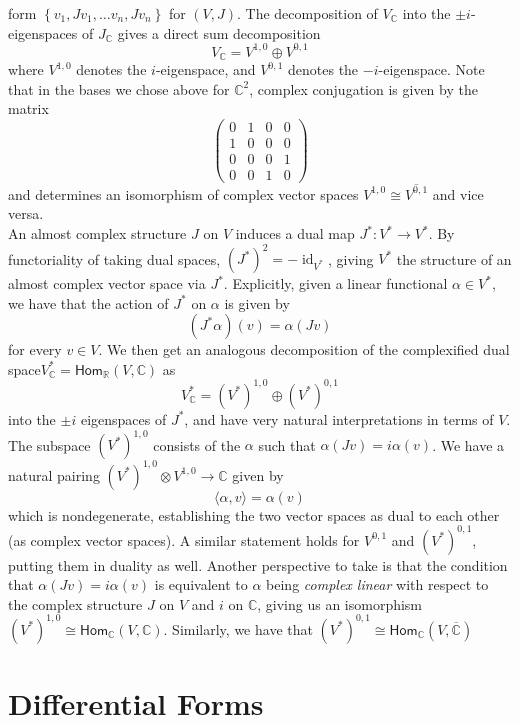 \documentclass[psamsfonts, 12pt]{amsart}
\theoremstyle{definition}
\theoremstyle{remark}
\renewcommand{\hom}{\mathsf{Hom}}
\newcommand{\R}{\mathbb{R}}
\newcommand{\C}{\mathbb{C}}
\newcommand{\set}[1]{\left\lbrace #1 \right\rbrace}
\DeclareMathOperator{\id}{id}
\begin{document}
form $\set{v_1, Jv_1, \ldots v_n, Jv_n}$ for $(V,J)$. The decomposition of $V_\C$ into
the $\pm i$-eigenspaces of $J_\C$ gives a direct sum decomposition
\[
V_\C = V^{1,0} \oplus V^{0,1}
\]
where $V^{1,0}$ denotes the $i$-eigenspace, and $V^{0,1}$ denotes the $-i$-eigenspace.
Note that in the bases we chose above for $\C^2$, complex conjugation is given by the
matrix
\[
\begin{pmatrix}
0 & 1 & 0 & 0\\
1 & 0 & 0 & 0 \\
0 & 0 & 0 & 1 \\
0 & 0 & 1 & 0
\end{pmatrix}
\]
and determines an isomorphism of complex vector spaces
$V^{1,0} \cong \overline{V^{0,1}}$ and vice versa. \\

An almost complex structure $J$ on $V$ induces a dual map $J^* : V^* \to V^*$. By
functoriality of taking dual spaces, $(J^*) ^2 = -\id_{V^*}$, giving $V^*$ the
structure of an almost complex vector space via $J^*$. Explicitly, given a linear
functional $\alpha \in V^*$, we have that the action of $J^*$ on $\alpha$ is given
by
\[
(J^*\alpha)(v) = \alpha(Jv)
\]
for every $v \in V$. We then get an analogous decomposition of the complexified
dual space$ V^*_\C = \hom_\R(V,\C)$ as
\[
V^*_\C = (V^*)^{1,0} \oplus (V^*)^{0,1}
\]
into the $\pm i$ eigenspaces of $J^*$, and have very natural interpretations in
terms of $V$. The subspace $(V^*)^{1,0}$ consists of the $\alpha$ such that
$\alpha(Jv) = i\alpha(v)$. We have a natural pairing $(V^*)^{1,0} \otimes V^{1,0} \to \C$
given by
\[
\langle \alpha,v \rangle = \alpha(v)
\]
which is nondegenerate, establishing the two vector spaces as dual to each other (as
complex vector spaces). A similar statement holds for $V^{0,1}$ and $(V^*)^{0,1}$,
putting them in duality as well. Another perspective to take is that the condition
that $\alpha(Jv) = i\alpha(v)$ is equivalent to $\alpha$ being \emph{complex linear}
with respect to the complex structure $J$ on $V$ and $i$ on $\C$, giving us an
isomorphism $(V^*)^{1,0} \cong \hom_\C(V,\C)$. Similarly, we have that
$(V^*)^{0,1} \cong \hom_{\C}(V,\overline{\C})$
%
\section{Differential Forms}
%
\end{document}
